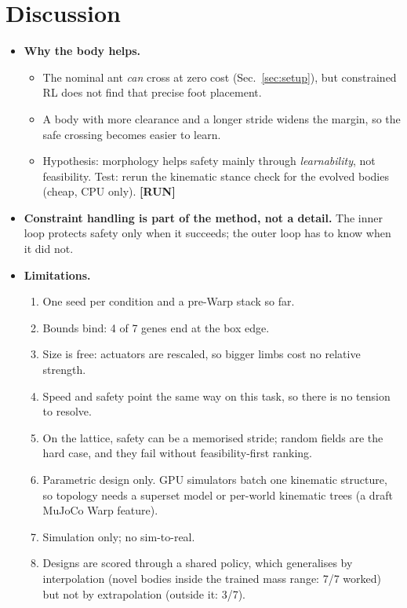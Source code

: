 \documentclass[sigconf,review]{acmart}
\newcommand{\statustag}[2]{\textcolor{#1}{\textsf{\scriptsize\bfseries[#2]}}}
\newcommand{\RUN}{\statustag{red!75!black}{RUN}\hspace{0.3em}}
\newcommand{\sectarget}[1]{\par\noindent{\color{gray}\sffamily\scriptsize Target length: #1}\par\smallskip}
\begin{document}
\section{Discussion}
\label{sec:discussion}
\sectarget{0.75 page}
\begin{itemize}
\item \textbf{Why the body helps.}
  \begin{itemize}
  \item The nominal ant \emph{can} cross at zero cost (Sec.~\ref{sec:setup}), but constrained RL does not find that precise foot placement.
  \item A body with more clearance and a longer stride widens the margin, so the safe crossing becomes easier to learn.
  \item Hypothesis: morphology helps safety mainly through \emph{learnability}, not feasibility. Test: rerun the kinematic stance check for the evolved bodies (cheap, CPU only). \RUN
  \end{itemize}
\item \textbf{Constraint handling is part of the method, not a detail.} The inner loop protects safety only when it succeeds; the outer loop has to know when it did not.
\item \textbf{Limitations.}
\label{sec:limits}
  \begin{enumerate}
  \item One seed per condition and a pre-Warp stack so far.
  \item Bounds bind: 4 of 7 genes end at the box edge.
  \item Size is free: actuators are rescaled, so bigger limbs cost no relative strength.
  \item Speed and safety point the same way on this task, so there is no tension to resolve.
  \item On the lattice, safety can be a memorised stride; random fields are the hard case, and they fail without feasibility-first ranking.
  \item Parametric design only. GPU simulators batch one kinematic structure, so topology needs a superset model or per-world kinematic trees (a draft MuJoCo Warp feature).
  \item Simulation only; no sim-to-real.
  \item Designs are scored through a shared policy, which generalises by interpolation (novel bodies inside the trained mass range: 7/7 worked) but not by extrapolation (outside it: 3/7).

\end{enumerate}
\end{itemize}
\end{document}
